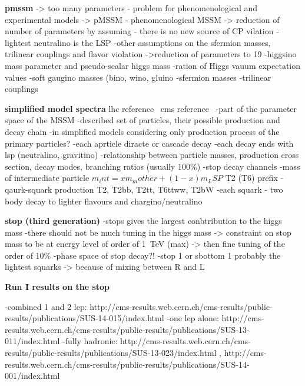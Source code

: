 \textbf{pmssm}
-> too many parameters - problem for phenomenological and experimental models
-> pMSSM - phenomenological MSSM -> reduction of number of parameters by assuming
	- there is no new source of CP vilation
	-lightest neutralino is the LSP
	-other assumptions on the sfermion masses, trilinear couplings and flavor violation
	->reduction of parameters to 19
		-higgsino mass parameter and pseudo-scalar higgs mass 
		-ration of Higgs vauum expectation values
		-soft gaugino masses (bino, wino, gluino
		-sfermion masses
		-trilinear couplings

\textbf{simplified model spectra}
lhc reference~\cite{Alves:2011wf, Alwall:2008ag}
cms reference~\cite{Chatrchyan:2013sza}
-part of the parameter space of the MSSM
-described set of particles, their possible production and decay chain
-in simplified models considering only production process of the primary particles?
-each aprticle diracte or cascade decay
-each decay ends with lsp (neutralino, gravitino)
-relationship between particle masses, production cross section, decay modes, branching ratios (usually 100\%)
-stop decay channels
-mass of intermediate particle
$m_int = x m_mother + (1-x)m_LSP $
T2 (T6) prefix - qaurk-squark production
T2, T2bb, T2tt, T6ttww, T2bW
	-each squark - two body decay to lighter flavours and chargino/neutralino


\textbf{stop (third generation)}
-stops gives the largest conbtribution to the higgs mass
-there should not be much tuning in the higgs mass -> constraint on stop mass to be at energy level of order of 1~TeV (max) -> then fine tuning of the order of 10\%
-phase space of stop decay?!
-stop 1 or sbottom 1 probably the lightest squarks  -> because of mixing between R and L 

\textbf{Run I results on the stop}

-combined 1 and 2 lep: http://cms-results.web.cern.ch/cms-results/public-results/publications/SUS-14-015/index.html
-one lep alone: http://cms-results.web.cern.ch/cms-results/public-results/publications/SUS-13-011/index.html
-fully hadronic: http://cms-results.web.cern.ch/cms-results/public-results/publications/SUS-13-023/index.html , http://cms-results.web.cern.ch/cms-results/public-results/publications/SUS-14-001/index.html
